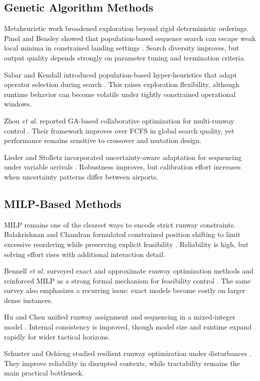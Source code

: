 \documentclass[conference]{IEEEtran}
\begin{document}
\subsection{Genetic Algorithm Methods}
Metaheuristic work broadened exploration beyond rigid deterministic orderings. Pinol and Beasley showed that population-based sequence search can escape weak local minima in constrained landing settings \cite{ref5}. Search diversity improves, but output quality depends strongly on parameter tuning and termination criteria.

Sabar and Kendall introduced population-based hyper-heuristics that adapt operator selection during search \cite{ref6}. This raises exploration flexibility, although runtime behavior can become volatile under tightly constrained operational windows.

Zhou \textit{et al.} reported GA-based collaborative optimization for multi-runway control \cite{ref7}. Their framework improves over FCFS in global search quality, yet performance remains sensitive to crossover and mutation design.

Lieder and Stolletz incorporated uncertainty-aware adaptation for sequencing under variable arrivals \cite{ref8}. Robustness improves, but calibration effort increases when uncertainty patterns differ between airports.

\subsection{MILP-Based Methods}
MILP remains one of the clearest ways to encode strict runway constraints. Balakrishnan and Chandran formulated constrained position shifting to limit excessive reordering while preserving explicit feasibility \cite{ref9}. Reliability is high, but solving effort rises with additional interaction detail.

Bennell \textit{et al.} surveyed exact and approximate runway optimization methods and reinforced MILP as a strong formal mechanism for feasibility control \cite{ref10}. The same survey also emphasizes a recurring issue: exact models become costly on larger dense instances.

Hu and Chen unified runway assignment and sequencing in a mixed-integer model \cite{ref11}. Internal consistency is improved, though model size and runtime expand rapidly for wider tactical horizons.

Schuster and Ochieng studied resilient runway optimization under disturbances \cite{ref12}. They improve reliability in disrupted contexts, while tractability remains the main practical bottleneck.
\end{document}

